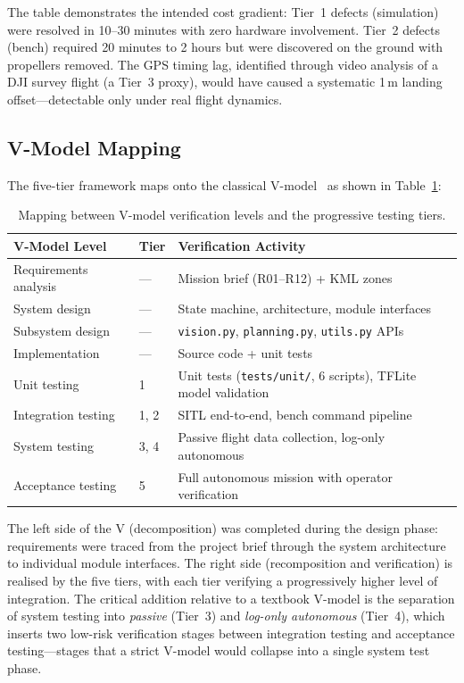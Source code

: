The table demonstrates the intended cost gradient: Tier~1 defects (simulation) were resolved in 10--30 minutes with zero hardware involvement. Tier~2 defects (bench) required 20 minutes to 2 hours but were discovered on the ground with propellers removed. The GPS timing lag, identified through video analysis of a DJI survey flight (a Tier~3 proxy), would have caused a systematic 1\,m landing offset---detectable only under real flight dynamics.

\subsection{V-Model Mapping}\label{sec:vmodel-mapping}

The five-tier framework maps onto the classical V-model~\cite{forsberg1991relationship} as shown in Table~\ref{tab:vmodel-map}:

\begin{table}[H]
\centering
\caption{Mapping between V-model verification levels and the progressive testing tiers.}
\label{tab:vmodel-map}
\small
\begin{tabular}{@{}lll@{}}
\toprule
\textbf{V-Model Level} & \textbf{Tier} & \textbf{Verification Activity} \\
\midrule
Requirements analysis & --- & Mission brief (R01--R12) + KML zones \\
System design & --- & State machine, architecture, module interfaces \\
Subsystem design & --- & \texttt{vision.py}, \texttt{planning.py}, \texttt{utils.py} APIs \\
Implementation & --- & Source code + unit tests \\
\midrule
Unit testing & 1 & Unit tests (\texttt{tests/unit/}, 6 scripts), TFLite model validation \\
Integration testing & 1, 2 & SITL end-to-end, bench command pipeline \\
System testing & 3, 4 & Passive flight data collection, log-only autonomous \\
Acceptance testing & 5 & Full autonomous mission with operator verification \\
\bottomrule
\end{tabular}
\end{table}

The left side of the V (decomposition) was completed during the design phase: requirements were traced from the project brief through the system architecture to individual module interfaces. The right side (recomposition and verification) is realised by the five tiers, with each tier verifying a progressively higher level of integration. The critical addition relative to a textbook V-model is the separation of system testing into \emph{passive} (Tier~3) and \emph{log-only autonomous} (Tier~4), which inserts two low-risk verification stages between integration testing and acceptance testing---stages that a strict V-model would collapse into a single system test phase.

